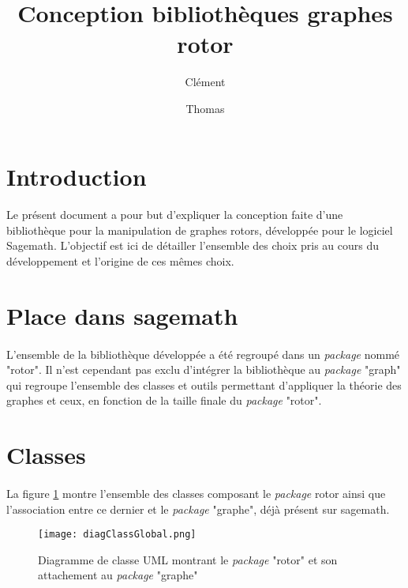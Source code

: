 \documentclass{article}
\title{Conception bibliothèques graphes rotor}
\author{Clément \bsc{Chrétien} \and Thomas \bsc{Petiteau}}
\begin{document}
	\maketitle
	\clearpage
	
	\tableofcontents
	\clearpage

	\section{Introduction}
	\paragraph*{}
	Le présent document a pour but d'expliquer la conception faite d'une bibliothèque pour la manipulation de graphes rotors, développée pour le logiciel Sagemath. L'objectif est ici de détailler l'ensemble des choix pris au cours du développement et l'origine de ces mêmes choix.
	
	\section{Place dans sagemath}
	\paragraph*{}
	L'ensemble de la bibliothèque développée a été regroupé dans un \textit{package} nommé "rotor". Il n'est cependant pas exclu d'intégrer la bibliothèque au \textit{package} "graph" qui regroupe l'ensemble des classes et outils permettant d'appliquer la théorie des graphes et ceux, en fonction de la taille finale du \textit{package} "rotor".
	
	\section{Classes}
	\paragraph*{}
	La figure \ref{fig:diagClassGlobal} montre l'ensemble des classes composant le \textit{package} rotor ainsi que l'association entre ce dernier et le \textit{package} "graphe", déjà présent sur sagemath.
	
	\begin{figure}[h]
		\texttt{[image: diagClassGlobal.png]}
		\centering
		\caption{Diagramme de classe UML montrant le \textit{package} "rotor" et son attachement au \textit{package} "graphe"}
		\label{fig:diagClassGlobal}
	\end{figure}
\end{document}
